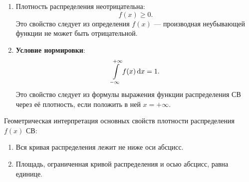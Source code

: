 \documentclass[a4paper]{article}
\newcommand{\sgeq}{\geqslant}
\newcommand{\key}[1]{{\bfseries\color{Medium} #1}}
\begin{document}
                    \begin{enumerate}
                        \item Плотность распределения неотрицательна:
                        \begin{equation*}
                            f(x) \sgeq 0 .
                        \end{equation*}
                        Это свойство следует из определения $f(x)$ --- производная неубывающей функции не может быть отрицательной.

                        \item \key{Условие нормировки}:
                        \begin{equation*}
                            \int\limits_{-\infty}^{+\infty} f(x) \dif x = 1 .
                        \end{equation*}
                        Это свойство следует из формулы выражения функции распределения СВ через её плотность, если положить в ней $x = +\infty$.
                    \end{enumerate}

                    Геометрическая интерпретация основных свойств плотности распределения $f(x)$ СВ:
                    \begin{enumerate}
                        \item Вся кривая распределения лежит не ниже оси абсцисс.
                        \item Площадь, ограниченная кривой распределения и осью абсцисс, равна единице.
                    \end{enumerate}
\end{document}
